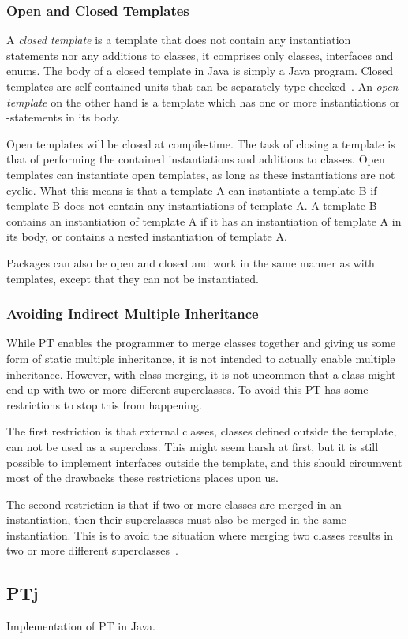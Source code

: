 \subsubsection{Open and Closed Templates}\label{subsubsec:open-and-closed-templates}

A \textit{closed template} is a template that does not contain any instantiation statements nor any additions to classes, it comprises only classes, interfaces and enums.
The body of a closed template in Java is simply a Java program.
Closed templates are self-contained units that can be separately type-checked~\cite{Axelsen2012}.
An \textit{open template} on the other hand is a template which has one or more instantiations or -statements in its body.

Open templates will be closed at compile-time.
The task of closing a template is that of performing the contained instantiations and additions to classes.
Open templates can instantiate open templates, as long as these instantiations are not cyclic.
What this means is that a template A can instantiate a template B if template B does not contain any instantiations of template A\@.
A template B contains an instantiation of template A if it has an instantiation of template A in its body, or contains a nested instantiation of template A\@.

Packages can also be open and closed and work in the same manner as with templates, except that they can not be instantiated.

\subsubsection{Avoiding Indirect Multiple Inheritance}\label{subsubsec:avoiding-indirect-multiple-inheritance}

While PT enables the programmer to merge classes together and giving us some form of static multiple inheritance, it is not intended to actually enable multiple inheritance.
However, with class merging, it is not uncommon that a class might end up with two or more different superclasses. To avoid this PT has some restrictions to stop this from happening.

The first restriction is that external classes, classes defined outside the template, can not be used as a superclass.
This might seem harsh at first, but it is still possible to implement interfaces outside the template, and this should circumvent most of the drawbacks these restrictions places upon us.

The second restriction is that if two or more classes are merged in an instantiation, then their superclasses must also be merged in the same instantiation.
This is to avoid the situation where merging two classes results in two or more different superclasses~\cite{jot}.

\subsection{PTj}\label{subsec:ptj}

Implementation of PT in Java.

